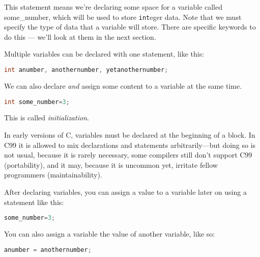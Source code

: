 This statement means we're declaring some space for a variable called
some\_number, which will be used to store \texttt{int}eger data. Note that we
must specify the type of data that a variable will store. There are specific
keywords to do this --- we'll look at them in the next section.

Multiple variables can be declared with one statement, like this:
\lstset{basicstyle=\scriptsize, numbers=left, captionpos=b, tabsize=4}
\begin{lstlisting}[caption=Section \thesection listing \arabic{varcnt},language={C},
breaklines=true,xleftmargin=15pt,label=lst:section\thesection listing\arabic{varcnt}]
int anumber, anothernumber, yetanothernumber;
\end{lstlisting}

We can also declare \emph{and} assign some content to a variable at the same time.
\lstset{basicstyle=\scriptsize, numbers=left, captionpos=b, tabsize=4}
\begin{lstlisting}[caption=Section \thesection listing \arabic{varcnt},language={C},
breaklines=true,xleftmargin=15pt,label=lst:section\thesection listing\arabic{varcnt}]
int some_number=3;
\end{lstlisting}

This is called \emph{initialization}.

In early versions of C, variables must be declared at the beginning of a block.
In C99 it is allowed to mix declarations and statements arbitrarily—but doing
so is not usual, because it is rarely necessary, some compilers still don’t
support C99 (portability), and it may, because it is uncommon yet, irritate
fellow programmers (maintainability).

After declaring variables, you can assign a value to a variable later on using a statement like this:
\lstset{basicstyle=\scriptsize, numbers=left, captionpos=b, tabsize=4}
\begin{lstlisting}[caption=Section \thesection listing \arabic{varcnt},language={C},
breaklines=true,xleftmargin=15pt,label=lst:section\thesection listing\arabic{varcnt}]
some_number=3;
\end{lstlisting}

You can also assign a variable the value of another variable, like so:
\lstset{basicstyle=\scriptsize, numbers=left, captionpos=b, tabsize=4}
\begin{lstlisting}[caption=Section \thesection listing \arabic{varcnt},language={C},
breaklines=true,xleftmargin=15pt,label=lst:section\thesection listing\arabic{varcnt}]
anumber = anothernumber;
\end{lstlisting}


